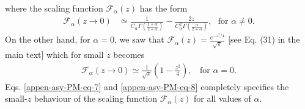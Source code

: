 \documentclass[superscriptaddress,amsmath,amssymb,aps,onecolumn]{revtex4}
\begin{document}
where the scaling function $\mathcal{F}_{\alpha} (z )$ has the form
\begin{align}
\mathcal{F}_{\alpha} (z \to 0) & \simeq \frac{1}{C_{\alpha} \Gamma \left( \frac{1+\alpha}{2+\alpha}\right)}-\frac{2z}{C_{\alpha} ^2 \Gamma\left( \frac{\alpha}{2+\alpha}\right)},~~~\text{for }\alpha \neq 0.
\label{appen-asy-PM-eq-7}
\end{align}
On the other hand, for $\alpha = 0 $, we saw that $\mathcal{F}_{\alpha}(z) = \frac{e^{-z^2/4}}{\sqrt{\pi}}$ [see Eq. (31) in the main text] which for small $z$ becomes
\begin{align}
\mathcal{F}_{\alpha} (z \to 0) \simeq \frac{1}{\sqrt{\pi}} \left( 1-\frac{z^2}{4}\right),~~~~\text{for }\alpha = 0.
\label{appen-asy-PM-eq-8}
\end{align}
Eqs. \eqref{appen-asy-PM-eq-7} and \eqref{appen-asy-PM-eq-8} completely specifies the small-$z$ behaviour of the scaling function $\mathcal{F}_{\alpha}(z) $ for all values of $\alpha$.
\end{document}
